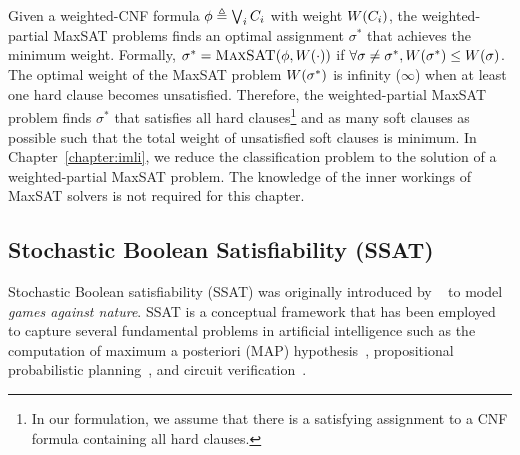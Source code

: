 Given a weighted-CNF formula $\phi \triangleq \bigvee_i C_i$ with weight $ W \! \left( C_i \right) $, the weighted-partial MaxSAT problems finds an optimal assignment $\sigma^*$ that achieves the minimum weight. Formally,  $\sigma^* = \textsc{MaxSAT}(\phi,W \! \left( \cdot \right))$ if $\forall \sigma \neq \sigma^*, W \! \left( \sigma^* \right) \leq W \! \left( \sigma \right)$. The optimal weight of the MaxSAT problem $  W \! \left( \sigma^* \right) $ is infinity ($ \infty $) when at least one hard clause becomes unsatisfied.  Therefore,  the weighted-partial MaxSAT problem finds $ \sigma^* $ that satisfies all hard clauses\footnote{In our formulation, we assume that there is a satisfying assignment to a CNF formula containing all hard clauses.} and as many soft clauses as possible such that the total weight of unsatisfied soft clauses is minimum. In Chapter~\ref{chapter:imli}, we reduce the classification problem  to the solution of a weighted-partial MaxSAT problem. The knowledge of the inner workings of {MaxSAT} solvers is  not required for this chapter.  




\subsection{Stochastic Boolean Satisfiability (SSAT)}\label{fairness_justicia_sec:ssat}
Stochastic Boolean satisfiability (SSAT) was originally introduced by ~\cite{papadimitriou1985games} to model {\em games against nature}.  SSAT is a conceptual framework that has been employed to capture several fundamental problems in artificial intelligence such as the computation of maximum a posteriori (MAP) hypothesis~\cite{fremont2017maximum},  propositional probabilistic planning~\cite{majercik2007appssat},  and circuit verification~\cite{lee2018towards}. 


